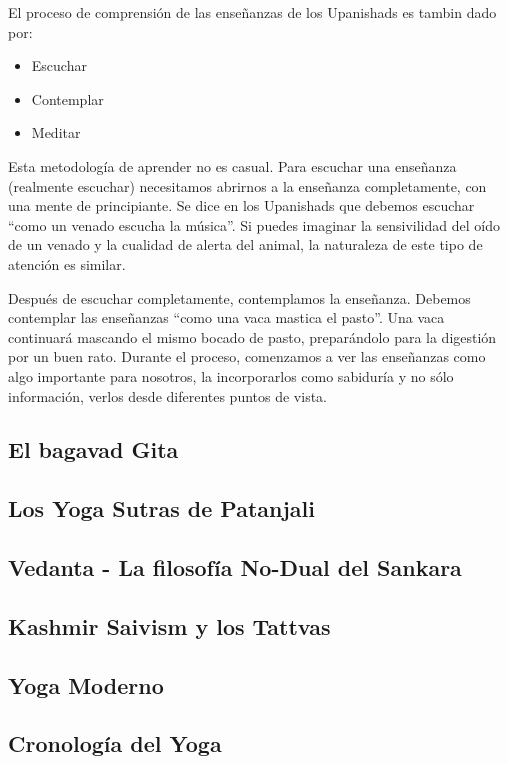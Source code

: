 El proceso de comprensión de las enseñanzas de los Upanishads es tambin dado por:
\begin{itemize}
	\item Escuchar
	\item Contemplar
	\item Meditar
\end{itemize}

Esta metodología de aprender no es casual. Para escuchar una enseñanza (realmente escuchar) necesitamos abrirnos a la enseñanza completamente, con una mente de principiante. Se dice en los Upanishads que debemos escuchar ``como un venado escucha la música''. Si puedes imaginar la sensivilidad del oído de un venado y la cualidad de alerta del animal, la naturaleza de este tipo de atención es similar.

Despu\'es de escuchar completamente, contemplamos la enseñanza. Debemos contemplar las enseñanzas ``como una vaca mastica el pasto''. Una vaca continuará mascando el mismo bocado de pasto, preparándolo para la digestión por un buen rato. Durante el proceso, comenzamos a ver las enseñanzas como algo importante para nosotros, la incorporarlos como sabiduría y no sólo información, verlos desde diferentes puntos de vista.

\subsection{El bagavad Gita}
\subsection{Los Yoga Sutras de Patanjali}
\subsection{Vedanta - La filosofía No-Dual del Sankara}
\subsection{Kashmir Saivism y los Tattvas}
\subsection{Yoga Moderno}
\subsection{Cronología del Yoga}
